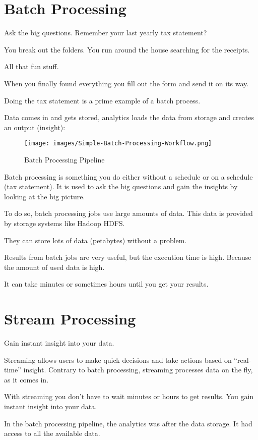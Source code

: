 \documentclass[12pt, numbers=noenddot]{scrreprt} %
\begin{document}
\section{Batch Processing} Ask the big questions. Remember your last yearly tax statement?

You break out the folders. You run around the house searching for the receipts.

All that fun stuff.

When you finally found everything you fill out the form and send it on its way.

Doing the tax statement is a prime example of a batch process.

Data comes in and gets stored, analytics loads the data from storage and creates an output (insight):

\begin{figure}[htbp]
  \centering
     \texttt{[image: images/Simple-Batch-Processing-Workflow.png]}
  \caption{Batch Processing Pipeline}
  \label{fig:Bild1}
\end{figure}

Batch processing is something you do either without a schedule or on a schedule (tax statement). It is used to ask the big questions and gain the insights by looking at the big picture.

To do so, batch processing jobs use large amounts of data. This data is provided by storage systems like Hadoop HDFS.

They can store lots of data (petabytes) without a problem.

Results from batch jobs are very useful, but the execution time is high. Because the amount of used data is high.

It can take minutes or sometimes hours until you get your results.



\section{Stream Processing} Gain instant insight into your data.

Streaming allows users to make quick decisions and take actions based on “real-time” insight. Contrary to batch processing, streaming processes data on the fly, as it comes in.

With streaming you don’t have to wait minutes or hours to get results. You gain instant insight into your data.

In the batch processing pipeline, the analytics was after the data storage. It had access to all the available data.
\end{document}
